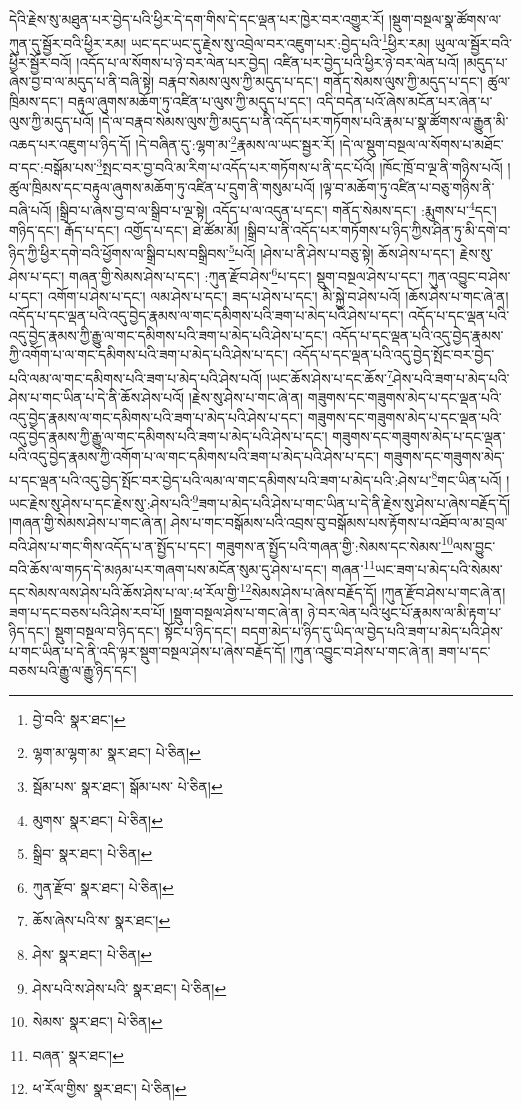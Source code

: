 དེའི་རྗེས་སུ་མཐུན་པར་བྱེད་པའི་ཕྱིར་དེ་དག་གིས་དེ་དང་ལྡན་པར་ཁྱེར་བར་འགྱུར་རོ། །སྡུག་བསྔལ་སྣ་ཚོགས་ལ་ཀུན་དུ་སྦྱོར་བའི་ཕྱིར་རམ། ཡང་དང་ཡང་དུ་རྗེས་སུ་འབྲེལ་བར་འཇུག་པར་:བྱེད་པའི་\footnote{བྱེ་བའི་  སྣར་ཐང་། }ཕྱིར་རམ། ཡུལ་ལ་སྦྱོར་བའི་ཕྱིར་སྦྱོར་བའོ། །འདོད་པ་ལ་སོགས་པ་ཉེ་བར་ལེན་པར་བྱེད། འཛིན་པར་བྱེད་པའི་ཕྱིར་ཉེ་བར་ལེན་པའོ། །མདུད་པ་ཞེས་བྱ་བ་ལ་མདུད་པ་ནི་བཞི་སྟེ། བརྣབ་སེམས་ལུས་ཀྱི་མདུད་པ་དང་། གནོད་སེམས་ལུས་ཀྱི་མདུད་པ་དང་། ཚུལ་ཁྲིམས་དང་། བརྟུལ་ཞུགས་མཆོག་ཏུ་འཛིན་པ་ལུས་ཀྱི་མདུད་པ་དང་། འདི་བདེན་པའོ་ཞེས་མངོན་པར་ཞེན་པ་ལུས་ཀྱི་མདུད་པའོ། །དེ་ལ་བརྣབ་སེམས་ལུས་ཀྱི་མདུད་པ་ནི་འདོད་པར་གཏོགས་པའི་རྣམ་པ་སྣ་ཚོགས་ལ་རྒྱུན་མི་འཆད་པར་འཇུག་པ་ཉིད་དོ། །དེ་བཞིན་དུ་:ལྷག་མ་\footnote{ལྷག་མ་ལྷག་མ་  སྣར་ཐང་།  པེ་ཅིན། }རྣམས་ལ་ཡང་སྦྱར་རོ། །དེ་ལ་སྡུག་བསྔལ་ལ་སོགས་པ་མཐོང་བ་དང་:བསྒོམ་པས་\footnote{སྦོམ་པས་  སྣར་ཐང་། སྒོམ་པས་  པེ་ཅིན། }སྤང་བར་བྱ་བའི་མ་རིག་པ་འདོད་པར་གཏོགས་པ་ནི་དང་པོའོ། །ཁོང་ཁྲོ་བ་ལྔ་ནི་གཉིས་པའོ། །ཚུལ་ཁྲིམས་དང་བརྟུལ་ཞུགས་མཆོག་ཏུ་འཛིན་པ་དྲུག་ནི་གསུམ་པའོ། །ལྟ་བ་མཆོག་ཏུ་འཛིན་པ་བཅུ་གཉིས་ནི་བཞི་པའོ། །སྒྲིབ་པ་ཞེས་བྱ་བ་ལ་སྒྲིབ་པ་ལྔ་སྟེ། འདོད་པ་ལ་འདུན་པ་དང་། གནོད་སེམས་དང་། :རྨུགས་པ་\footnote{མུགས་  སྣར་ཐང་།  པེ་ཅིན། }དང་། གཉིད་དང་། རྒོད་པ་དང་། འགྱོད་པ་དང་། ཐེ་ཚོམ་མོ། །སྒྲིབ་པ་ནི་འདོད་པར་གཏོགས་པ་ཉིད་ཀྱིས་ཤིན་ཏུ་མི་དགེ་བ་ཉིད་ཀྱི་ཕྱིར་དགེ་བའི་ཕྱོགས་ལ་སྒྲིབ་པས་བསྒྲིབས་\footnote{སྒྲིབ་  སྣར་ཐང་།  པེ་ཅིན། }པའོ། །ཤེས་པ་ནི་ཤེས་པ་བཅུ་སྟེ། ཆོས་ཤེས་པ་དང་། རྗེས་སུ་ཤེས་པ་དང་། གཞན་གྱི་སེམས་ཤེས་པ་དང་། :ཀུན་རྫོབ་ཤེས་\footnote{ཀུན་རྫོབ་  སྣར་ཐང་།  པེ་ཅིན། }པ་དང་། སྡུག་བསྔལ་ཤེས་པ་དང་། ཀུན་འབྱུང་བ་ཤེས་པ་དང་། འགོག་པ་ཤེས་པ་དང་། ལམ་ཤེས་པ་དང་། ཟད་པ་ཤེས་པ་དང་། མི་སྐྱེ་བ་ཤེས་པའོ། །ཆོས་ཤེས་པ་གང་ཞེ་ན། འདོད་པ་དང་ལྡན་པའི་འདུ་བྱེད་རྣམས་ལ་གང་དམིགས་པའི་ཟག་པ་མེད་པའི་ཤེས་པ་དང་། འདོད་པ་དང་ལྡན་པའི་འདུ་བྱེད་རྣམས་ཀྱི་རྒྱུ་ལ་གང་དམིགས་པའི་ཟག་པ་མེད་པའི་ཤེས་པ་དང་། འདོད་པ་དང་ལྡན་པའི་འདུ་བྱེད་རྣམས་ཀྱི་འགོག་པ་ལ་གང་དམིགས་པའི་ཟག་པ་མེད་པའི་ཤེས་པ་དང་། འདོད་པ་དང་ལྡན་པའི་འདུ་བྱེད་སྤོང་བར་བྱེད་པའི་ལམ་ལ་གང་དམིགས་པའི་ཟག་པ་མེད་པའི་ཤེས་པའོ། །ཡང་ཆོས་ཤེས་པ་དང་ཆོས་\footnote{ཆོས་ཞེས་པའི་ས་  སྣར་ཐང་། }ཤེས་པའི་ཟག་པ་མེད་པའི་ཤེས་པ་གང་ཡིན་པ་དེ་ནི་ཆོས་ཤེས་པའོ། །རྗེས་སུ་ཤེས་པ་གང་ཞེ་ན། གཟུགས་དང་གཟུགས་མེད་པ་དང་ལྡན་པའི་འདུ་བྱེད་རྣམས་ལ་གང་དམིགས་པའི་ཟག་པ་མེད་པའི་ཤེས་པ་དང་། གཟུགས་དང་གཟུགས་མེད་པ་དང་ལྡན་པའི་འདུ་བྱེད་རྣམས་ཀྱི་རྒྱུ་ལ་གང་དམིགས་པའི་ཟག་པ་མེད་པའི་ཤེས་པ་དང་། གཟུགས་དང་གཟུགས་མེད་པ་དང་ལྡན་པའི་འདུ་བྱེད་རྣམས་ཀྱི་འགོག་པ་ལ་གང་དམིགས་པའི་ཟག་པ་མེད་པའི་ཤེས་པ་དང་། གཟུགས་དང་གཟུགས་མེད་པ་དང་ལྡན་པའི་འདུ་བྱེད་སྤོང་བར་བྱེད་པའི་ལམ་ལ་གང་དམིགས་པའི་ཟག་པ་མེད་པའི་:ཤེས་པ་\footnote{ཤེས་  སྣར་ཐང་།  པེ་ཅིན། }གང་ཡིན་པའོ། །ཡང་རྗེས་སུ་ཤེས་པ་དང་རྗེས་སུ་:ཤེས་པའི་\footnote{ཤེས་པའི་ས་ཤེས་པའི་  སྣར་ཐང་།  པེ་ཅིན། }ཟག་པ་མེད་པའི་ཤེས་པ་གང་ཡིན་པ་དེ་ནི་རྗེས་སུ་ཤེས་པ་ཞེས་བརྗོད་དོ། །གཞན་གྱི་སེམས་ཤེས་པ་གང་ཞེ་ན། ཤེས་པ་གང་བསྒོམས་པའི་འབྲས་བུ་བསྒོམས་པས་རྟོགས་པ་འཐོབ་ལ་མ་བྲལ་བའི་ཤེས་པ་གང་གིས་འདོད་པ་ན་སྤྱོད་པ་དང་། གཟུགས་ན་སྤྱོད་པའི་གཞན་གྱི་:སེམས་དང་སེམས་\footnote{སེམས་  སྣར་ཐང་།  པེ་ཅིན། }ལས་བྱུང་བའི་ཆོས་ལ་གཏད་དེ་མཉམ་པར་གཞག་པས་མངོན་སུམ་དུ་ཤེས་པ་དང་། གཞན་\footnote{བཞན་  སྣར་ཐང་། }ཡང་ཟག་པ་མེད་པའི་སེམས་དང་སེམས་ལས་ཤེས་པའི་ཆོས་ཤེས་པ་ལ་:ཕ་རོལ་གྱི་\footnote{ཕ་རོལ་གྱིས་  སྣར་ཐང་།  པེ་ཅིན། }སེམས་ཤེས་པ་ཞེས་བརྗོད་དོ། །ཀུན་རྫོབ་ཤེས་པ་གང་ཞེ་ན། ཟག་པ་དང་བཅས་པའི་ཤེས་རབ་པོ། །སྡུག་བསྔལ་ཤེས་པ་གང་ཞེ་ན། ཉེ་བར་ལེན་པའི་ཕུང་པོ་རྣམས་ལ་མི་རྟག་པ་ཉིད་དང་། སྡུག་བསྔལ་བ་ཉིད་དང་། སྟོང་པ་ཉིད་དང་། བདག་མེད་པ་ཉིད་དུ་ཡིད་ལ་བྱེད་པའི་ཟག་པ་མེད་པའི་ཤེས་པ་གང་ཡིན་པ་དེ་ནི་འདི་ལྟར་སྡུག་བསྔལ་ཤེས་པ་ཞེས་བརྗོད་དོ། །ཀུན་འབྱུང་བ་ཤེས་པ་གང་ཞེ་ན། ཟག་པ་དང་བཅས་པའི་རྒྱུ་ལ་རྒྱུ་ཉིད་དང་། 